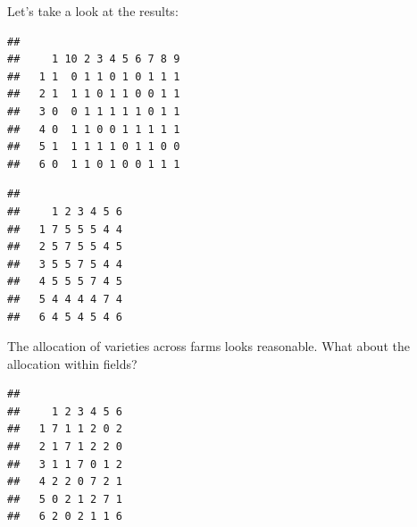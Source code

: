 \documentclass[
]{book}
\newenvironment{Shaded}{\begin{snugshade}}{\end{snugshade}}
\newcommand{\FunctionTok}[1]{\textcolor[rgb]{0.00,0.00,0.00}{#1}}
\newcommand{\NormalTok}[1]{#1}
\newcommand{\SpecialCharTok}[1]{\textcolor[rgb]{0.00,0.00,0.00}{#1}}
\begin{document}
Let's take a look at the results:

\begin{Shaded}
\end{Shaded}

\begin{verbatim}
##    
##     1 10 2 3 4 5 6 7 8 9
##   1 1  0 1 1 0 1 0 1 1 1
##   2 1  1 1 0 1 1 0 0 1 1
##   3 0  0 1 1 1 1 1 0 1 1
##   4 0  1 1 0 0 1 1 1 1 1
##   5 1  1 1 1 1 0 1 1 0 0
##   6 0  1 1 0 1 0 0 1 1 1
\end{verbatim}

\begin{Shaded}
\end{Shaded}

\begin{verbatim}
##    
##     1 2 3 4 5 6
##   1 7 5 5 5 4 4
##   2 5 7 5 5 4 5
##   3 5 5 7 5 4 4
##   4 5 5 5 7 4 5
##   5 4 4 4 4 7 4
##   6 4 5 4 5 4 6
\end{verbatim}

The allocation of varieties across farms looks reasonable. What about the allocation within fields?

\begin{Shaded}
\end{Shaded}

\begin{verbatim}
##    
##     1 2 3 4 5 6
##   1 7 1 1 2 0 2
##   2 1 7 1 2 2 0
##   3 1 1 7 0 1 2
##   4 2 2 0 7 2 1
##   5 0 2 1 2 7 1
##   6 2 0 2 1 1 6
\end{verbatim}
\end{document}
